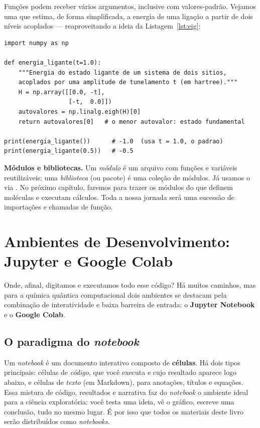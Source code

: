 Funções podem receber vários argumentos, inclusive com valores-padrão. Vejamos
uma que estima, de forma simplificada, a energia de uma ligação a partir de dois
níveis acoplados --- reaproveitando a ideia da Listagem~\ref{lst:eig}:

\begin{lstlisting}[style=python,caption={Função com valor-padrão e uso de \numpy{}.}]
import numpy as np

def energia_ligante(t=1.0):
    """Energia do estado ligante de um sistema de dois sitios,
    acoplados por uma amplitude de tunelamento t (em hartree)."""
    H = np.array([[0.0, -t],
                  [-t,  0.0]])
    autovalores = np.linalg.eigh(H)[0]
    return autovalores[0]   # o menor autovalor: estado fundamental

print(energia_ligante())      # -1.0  (usa t = 1.0, o padrao)
print(energia_ligante(0.5))   # -0.5
\end{lstlisting}

\begin{caixanota}
\textbf{Módulos e bibliotecas.} Um \emph{módulo} é um arquivo  com funções
e variáveis reutilizáveis; uma \emph{biblioteca} (ou pacote) é uma coleção de
módulos. Já usamos o \numpy{} via . No próximo capítulo,
faremos  para trazer os módulos do \pyscf{} que
definem moléculas e executam cálculos. Toda a nossa jornada será uma sucessão de
importações e chamadas de função.
\end{caixanota}

\section{Ambientes de Desenvolvimento: Jupyter e Google Colab}
\label{sec:ambientes}

Onde, afinal, digitamos e executamos todo esse código? Há muitos caminhos, mas
para a química quântica computacional dois ambientes se destacam pela combinação
de interatividade e baixa barreira de entrada: o \textbf{Jupyter Notebook} e o
\textbf{Google Colab}.

\subsection{O paradigma do \emph{notebook}}

Um \emph{notebook} é um documento interativo composto de \textbf{células}. Há dois
tipos principais: células de \emph{código}, que você executa e cujo resultado
aparece logo abaixo, e células de \emph{texto} (em Markdown), para anotações,
títulos e equações. Essa mistura de código, resultados e narrativa faz do
\emph{notebook} o ambiente ideal para a ciência exploratória: você testa uma
ideia, vê o gráfico, escreve uma conclusão, tudo no mesmo lugar. É por isso que
todos os materiais deste livro serão distribuídos como \emph{notebooks}.


